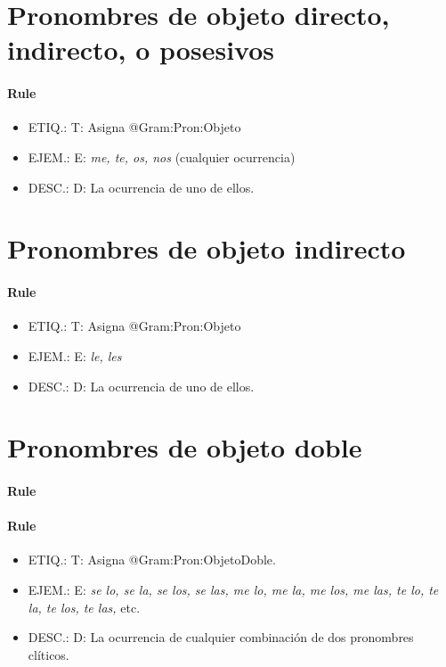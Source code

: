 \documentclass[11pt]{report}
\begin{document}
\section{Pronombres de objeto directo, indirecto, o posesivos}
\paragraph*{Rule}
\begin{itemize}
\item ETIQ.:  T: Asigna @Gram:Pron:Objeto
\item EJEM.:  E: \emph{me, te, os, nos} (cualquier ocurrencia)
\item DESC.:  D: La ocurrencia de uno de ellos.
\end{itemize}

\section{Pronombres de objeto indirecto}
\paragraph*{Rule}
\begin{itemize}
\item ETIQ.:  T: Asigna @Gram:Pron:Objeto
\item EJEM.:  E: \emph{le, les}
\item DESC.:  D: La ocurrencia de uno de ellos.
\end{itemize}

\section{Pronombres de objeto doble}
\paragraph*{Rule}
\paragraph*{Rule}
\begin{itemize}
\item ETIQ.:  T: Asigna @Gram:Pron:ObjetoDoble.
\item EJEM.:  E: \emph{se lo, se la, se los, se las, me lo, me la, me los, me las, te lo, te la, te los, te las,} etc.
\item DESC.:  D: La ocurrencia de cualquier combinación de dos pronombres clíticos.
\end{itemize}
\end{document}
